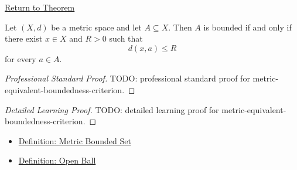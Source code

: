 \newpage
{}
\label{prf:metric-equivalent-boundedness-criterion}

\begin{remark*}[Return]
\hyperref[thm:metric-equivalent-boundedness-criterion]{Return to Theorem}
\end{remark*}

\begin{theorem*}
Let \((X,d)\) be a metric space and let \(A\subseteq X\).  Then \(A\) is
bounded if and only if there exist \(x\in X\) and \(R>0\) such that
\[
  d(x,a)\leq R
\]
for every \(a\in A\).
\end{theorem*}

\begin{proof}[Professional Standard Proof]
\LRAProofBodyStart
TODO: professional standard proof for metric-equivalent-boundedness-criterion.
\end{proof}

\begin{proof}[Detailed Learning Proof]
\LRAProofBodyStart
TODO: detailed learning proof for metric-equivalent-boundedness-criterion.
\end{proof}

\begin{remark*}
\end{remark*}

\begin{dependencies}
\begin{itemize}
  \item \hyperref[def:metric-bounded-set]{Definition: Metric Bounded Set}
  \item \hyperref[def:metric-open-ball]{Definition: Open Ball}
\end{itemize}
\end{dependencies}

\clearpage
